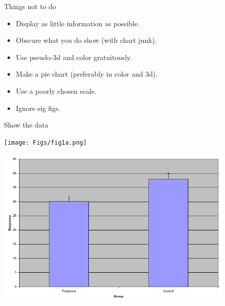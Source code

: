 \documentclass[12pt]{article}
\newcommand{\headsize}{\fontsize{35}{35} \selectfont}
\newcommand{\smallsize}{\fontsize{25}{30} \selectfont}
\begin{document}
\newpage

\headsize \color{yellow}
\hfill \begin{minipage}{5.75in}
\centering
Things not to do
\end{minipage}

\vspace{35mm}
\smallsize \color{white}


\hfill \begin{minipage}{9.6in}
\color{white}
\begin{itemize}
\item Display as little information as possible.
\item Obscure what you do show (with chart junk).
\item Use pseudo-3d and color gratuitously.
\item Make a pie chart (preferably in color and 3d).
\item Use a poorly chosen scale.
\item Ignore sig figs.
\end{itemize}
\end{minipage}



\newpage


\headsize \color{yellow}
\hfill \begin{minipage}{5.75in}
\centering
Show the data
\end{minipage}

\vspace{30mm}

\begin{minipage}[t]{4.5in}
\vspace*{0cm}

\texttt{[image: Figs/fig1a.png]}
\end{minipage}
\hfill
\begin{minipage}[t]{4.5in}
\vspace*{0cm}

\includegraphics[width=4.5in]{Figs/fig1c.png}
\end{minipage}
\end{document}
